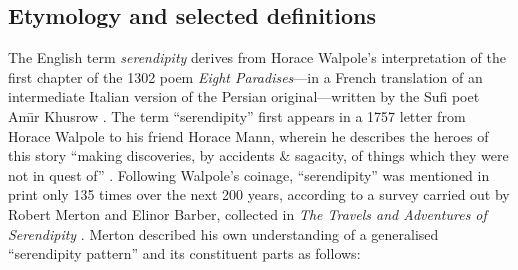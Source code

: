 
\subsection{Etymology and selected definitions}
The English term \emph{serendipity} derives from Horace Walpole's
interpretation of the first chapter of the 1302 poem \emph{Eight
  Paradises}---in a French translation of an intermediate Italian version of the Persian original---written by the Sufi
poet Am\={\i}r Khusrow \cite{van1994anatomy,remer1965serendipity}.  
The term ``serendipity'' first appears in a 1757 letter from Horace
Walpole to his friend Horace Mann, wherein he describes the heroes of
this story ``making discoveries, by accidents \& sagacity, of things
which they were not in quest of''
\cite[pp.~407--408]{walpole1937yale}.
Following Walpole's coinage, ``serendipity'' was mentioned in print
only 135 times over the next 200 years,
according to a survey carried out by Robert Merton and Elinor Barber, collected in \emph{The Travels and
  Adventures of Serendipity} \citep{merton}.  Merton described his own
understanding of a generalised ``serendipity pattern'' and its
constituent parts as follows:

